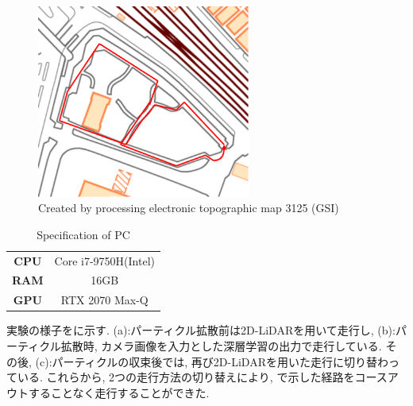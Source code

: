 \documentclass[uplatex, twocolumn, 9pt]{jsproceedings}
\begin{document}
\begin{figure}[h]
  \centering
  \includegraphics[width=70mm]{fig/tsudanuma-seg.pdf}
  \caption{Created by processing electronic topographic map 3125 (GSI)}
  \label{fig:tsudanuma}%
\end{figure}

\begin{table}[h]
  \centering
  \caption{Specification of PC}
  \label{table:pc}
  \begin{tabular}{cc}
  \toprule%
  \textbf{CPU} & Core i7-9750H(Intel)\\
  \textbf{RAM} & 16GB\\
  \textbf{GPU} & RTX 2070 Max-Q\\
  \bottomrule%
  \end{tabular}
\end{table}

\newpage
実験の様子をに示す. (a):パーティクル拡散前は2D-LiDARを用いて走行し, (b):パーティクル拡散時, カメラ画像を入力とした深層学習の出力で走行している. その後, (c):パーティクルの収束後では, 再び2D-LiDARを用いた走行に切り替わっている. これらから, 2つの走行方法の切り替えにより, \cite{tsudanuma}で示した経路をコースアウトすることなく走行することができた. 
\end{document}
